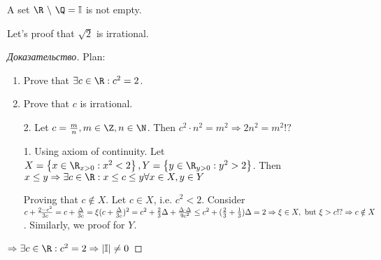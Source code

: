 \begin{theorem}
	A set $\R \ \backslash \ \Q = \mathbb{I}$ is not empty.
\end{theorem}

Let's proof that $\sqrt{2}$ is irrational.
\begin{proof}[Доказательство]
	Plan:
	\begin{enumerate}
		\item Prove that $\exists c \in \R: c^2=2$.
		\item  Prove that $c$ is irrational.
	\end{enumerate}	
	\begin{enumerate}
		\item [2. ] Let $c = \frac{m}{n}, m \in \Z, n \in \N$. Then $c^2 \cdot n^2 = m^2 \Rightarrow 2n^2 = m^2 !?$
		\item [1. ] Using axiom of continuity. Let $X = \left\{ x \in \R_{x > 0}: x^{2} < 2 \right \} , Y = \left\{ y \in \R_{y > 0}: y^2>2 \right \} $. Then $x \leq y \Rightarrow \exists c \in \R: x \leq c \leq y \forall x \in X, y \in Y$ 
			
	Proving that $c \notin X$. Let  $c \in X$, i.e. $c^2 < 2$. Consider $c + \frac{2 - c^2}{3c} = c + \frac{\Delta}{3c} = \xi \\ (c + \frac{\Delta}{3c})^2 = c^2 + \frac{2}{3}\Delta + \frac{\Delta \cdot \Delta}{9c^2} \leq c^2 + (\frac{2}{3} + \frac{1}{3})\Delta = 2 \Rightarrow \xi \in X, \text{ but } \xi > c !? \Rightarrow c \notin X$. Similarly, we proof for $Y$.
	\end{enumerate}
	$ \Rightarrow \exists c \in \R: c^2 = 2 \Rightarrow |\mathbb{I}| \neq 0$
\end{proof}

